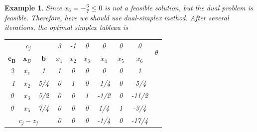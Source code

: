 \documentclass{article}
\newtheorem{example}{Example}
\begin{document}
\begin{example}
 	 Since $x_6 = -\frac{6}{7} \leq 0$ is not a feasible solution, but the dual problem is feasible. Therefore, here we should use dual-simplex method. After several iterations, the optimal simplex tableau is
 	 \begin{table}[htbp]
 	 	\centering
 	 	\begin{tabular}{@{}cccccccccc@{}}
 	 		\toprule
 	 		\multicolumn{3}{c}{$c_j$}      & 3       & -1    & 0    & 0    & 0      &  0 & \multirow{2}{*}{$\theta$} \\ \cmidrule(r){1-9}
 	 		$\bm{c_B}$     & $\bm{x}_B$     & $\bm{b}$       & $x_1$    & $x_2$ & $x_3$ & $x_4$ & $x_5$ & $x_6$ &                        \\ \midrule
 	 		3        & $x_1$     & 1      & 1       & 0    & 0   & 0    & 0     &   1 &                    \\
 	 		-1        & $x_2$     & 5/4      & 0        & 1    & 0    & -1/4    & 0     &  -5/4  &                  \\
 	 		0        & $x_3$     & 5/2       & 0       & 0    & 1    & -1/2    & 0     &  -11/2 &                  \\ 
 	 		0   & $x_5$      &  7/4         &   0      &  0    & 0    & 1/4    & 1     &   -3/4  &  \\ \midrule
 	 		\multicolumn{3}{c}{$c_j-z_j$} & 0       & 0    & 0    & -1/4    & 0   &  -17/4 &                    \\  \bottomrule
 	 	\end{tabular}%
 	 \end{table}
  
  	\
  	
  	\
  	

\end{example}
\end{document}
